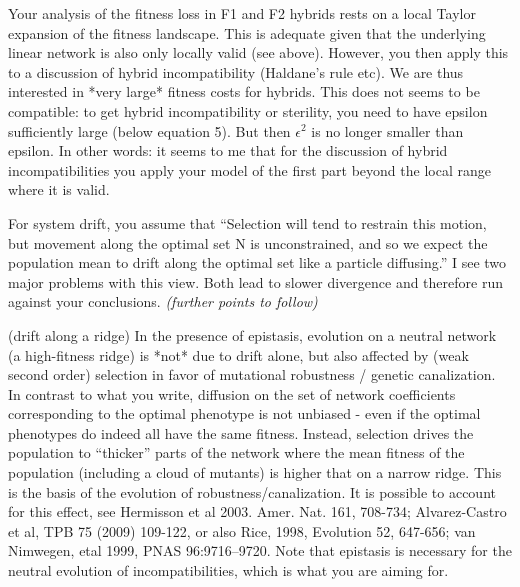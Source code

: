 
\begin{point}{}
    Your analysis of the fitness loss in F1 and F2 hybrids rests on a local
Taylor expansion of the fitness landscape. This is adequate given that the
underlying linear network is also only locally valid (see above). However, you
then apply this to a discussion of hybrid incompatibility (Haldane's rule etc).
We are thus interested in *very large* fitness costs for hybrids. This does not
seems to be compatible: to get hybrid incompatibility or sterility, you need to
have epsilon sufficiently large (below equation 5). But then $\epsilon^2$ is no
longer smaller than epsilon. In other words: it seems to me that for the
discussion of hybrid incompatibilities you apply your model of the first part
beyond the local range where it is valid.
\end{point}

\reply{
}

\begin{point}{}
    For system drift, you assume that ``Selection will tend to restrain this
motion, but movement along the optimal set N is unconstrained, and so we expect
the population mean to drift along the optimal set like a particle diffusing.''
I see two major problems with this view. Both lead to slower divergence and
therefore run against your conclusions.
    \textit{(further points to follow)}
\end{point}

\reply{
}

\begin{point}{(drift along a ridge)}
    In the presence of epistasis, evolution on a neutral network (a high-fitness
  ridge) is *not* due to drift alone, but also affected by (weak second order)
selection in favor of mutational robustness / genetic canalization. In contrast
to what you write, diffusion on the set of network coefficients corresponding
to the optimal phenotype is not unbiased - even if the optimal phenotypes do
indeed all have the same fitness. Instead, selection drives the population to
``thicker'' parts of the network where the mean fitness of the population
(including a cloud of mutants) is higher that on a narrow ridge. This is the
basis of the evolution of robustness/canalization. It is possible to account
for this effect, see Hermisson et al 2003. Amer. Nat. 161, 708-734;
Alvarez-Castro et al, TPB 75 (2009) 109-122, or also Rice, 1998, Evolution 52,
647-656; van Nimwegen, etal 1999, PNAS 96:9716–9720. Note that epistasis is
necessary for the neutral evolution of incompatibilities, which is what you are
aiming for.
\end{point}

